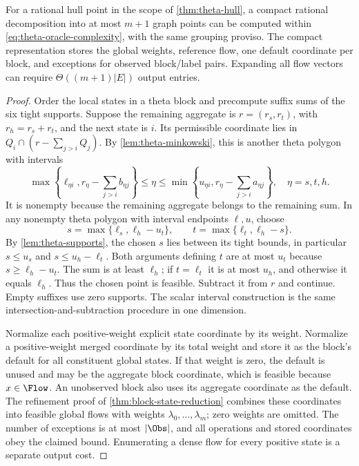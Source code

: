 \begin{proposition}\label{prop:theta-recovery}
For a rational hull point in the scope of \cref{thm:theta-hull}, a compact
rational decomposition into at most $m+1$ graph points can be computed
within \eqref{eq:theta-oracle-complexity}, with the same grouping proviso.
The compact representation stores the global weights, reference flow,
one default coordinate per block, and exceptions for observed block/label
pairs. Expanding all flow vectors can require $\Theta((m+1)|E|)$ output
entries.
\end{proposition}
\begin{proof}
Order the local states in a theta block and precompute suffix sums of
the six tight supports. Suppose the remaining aggregate is $r=(r_s,r_t)$,
with $r_h=r_s+r_t$, and the next state is $i$. Its permissible coordinate
lies in $Q_i\cap(r-\sum_{j>i}Q_j)$. By
\cref{lem:theta-minkowski}, this is another theta polygon with intervals
\begin{equation}\label{eq:theta-recovery-intersection}
 \max\left\{\ell_{\eta i},r_\eta-\sum_{j>i}b_{\eta j}\right\}
 \le\eta\le
 \min\left\{u_{\eta i},r_\eta-\sum_{j>i}a_{\eta j}\right\},
 \quad\eta=s,t,h.
\end{equation}
It is nonempty because the remaining aggregate belongs to the remaining
sum. In any nonempty theta polygon with interval endpoints $\ell,u$,
choose
\begin{equation}\label{eq:theta-point-choice}
 s=\max\{\ell_s,\ell_h-u_t\},\qquad
 t=\max\{\ell_t,\ell_h-s\}.
\end{equation}
By \cref{lem:theta-supports}, the chosen $s$ lies between its tight
bounds, in particular $s\le u_s$ and $s\le u_h-\ell_t$. Both
arguments defining $t$ are at most $u_t$ because
$s\ge\ell_h-u_t$. The sum is at least $\ell_h$; if $t=\ell_t$ it
is at most $u_h$, and otherwise it equals $\ell_h$. Thus the chosen
point is feasible. Subtract it from $r$ and continue. Empty suffixes
use zero supports. The scalar interval construction is the same
intersection-and-subtraction procedure in one dimension.

Normalize each positive-weight explicit state coordinate by its weight.
Normalize a positive-weight merged coordinate by its total weight and
store it as the block's default for all constituent global states.
If that weight is zero, the default is unused and may be the aggregate
block coordinate, which is feasible because $x\in\Flow$. An unobserved
block also uses its aggregate coordinate as the default. The refinement
proof of \cref{thm:block-state-reduction} combines these coordinates into
feasible global flows with weights $\lambda_0,\ldots,\lambda_m$; zero
weights are omitted. The number of exceptions is at most $|\Obs|$,
and all operations and stored coordinates obey the claimed bound.
Enumerating a dense flow for every positive state is a separate output cost.
\end{proof}


